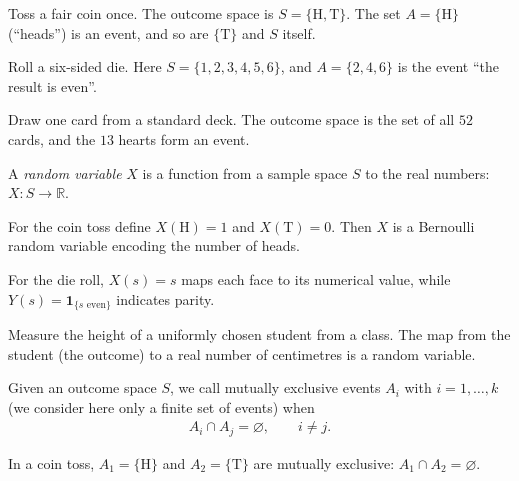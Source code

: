 \documentclass[a4paper, 12pt]{book}
\begin{document}
\begin{example}
    Toss a fair coin once. The outcome space is $S=\{\mathrm{H},\mathrm{T}\}$. The set $A=\{\mathrm{H}\}$ (``heads'') is an event, and so are $\{\mathrm{T}\}$ and $S$ itself.
\end{example}

\begin{example}
    Roll a six-sided die. Here $S=\{1,2,3,4,5,6\}$, and $A=\{2,4,6\}$ is the event ``the result is even''.
\end{example}

\begin{example}
    Draw one card from a standard deck. The outcome space is the set of all $52$ cards, and the $13$ hearts form an event.
\end{example}

\begin{definition}
    A \emph{random variable} $X$ is a function from a sample space $S$ to the real numbers: $X : S \to \mathbb{R}$.
\end{definition}

\begin{example}
    For the coin toss define $X(\mathrm{H})=1$ and $X(\mathrm{T})=0$. Then $X$ is a Bernoulli random variable encoding the number of heads.
\end{example}

\begin{example}
    For the die roll, $X(s)=s$ maps each face to its numerical value, while $Y(s)=\mathbf{1}_{\{s \text{ even}\}}$ indicates parity.
\end{example}

\begin{example}
    Measure the height of a uniformly chosen student from a class. The map from the student (the outcome) to a real number of centimetres is a random variable.
\end{example}

\begin{definition}
    Given an outcome space $S$, we call mutually exclusive events $A_i$ with $i=1,\ldots,k$ (we consider here only a finite set of
events) when 
\begin{align}
    A_i \cap A_j = \varnothing, \qquad i \neq j.
\end{align}
\end{definition}
\begin{example}
    In a coin toss, $A_1=\{\mathrm{H}\}$ and $A_2=\{\mathrm{T}\}$ are mutually exclusive: $A_1\cap A_2=\varnothing$.
\end{example}
\end{document}
